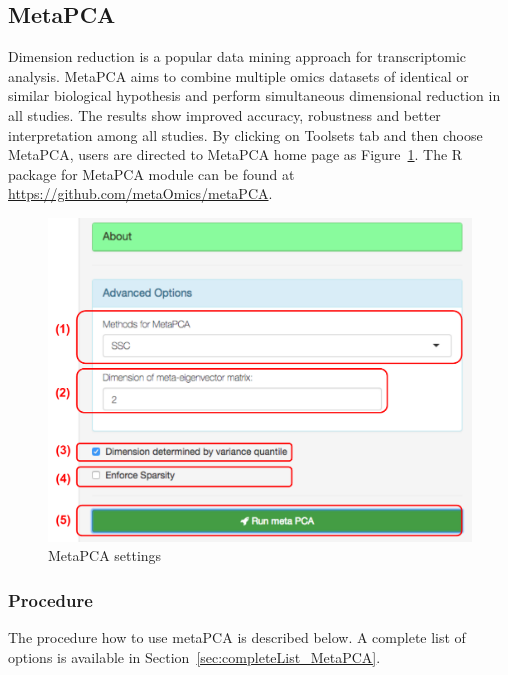 \subsection{MetaPCA}
Dimension reduction is a popular data mining approach for transcriptomic analysis.
MetaPCA aims to combine multiple omics datasets of identical or similar biological hypothesis and perform simultaneous dimensional reduction in all studies.
The results show improved accuracy, robustness and better interpretation among all studies.
By clicking on Toolsets tab and then choose MetaPCA,
users are directed to MetaPCA home page as Figure~\ref{fig:metaPCAHome}.
The R package for MetaPCA module can be found at \url{https://github.com/metaOmics/metaPCA}.

\begin{figure}[H]
\begin{center}
\includegraphics[scale=0.4]{./figure/metaPCA/metaPCAHome.pdf}
\caption{MetaPCA settings}
\label{fig:metaPCAHome}
\end{center}
\end{figure}

\subsubsection{Procedure}

The procedure how to use metaPCA is described below.
A complete list of options is available in Section~\ref{sec:completeList_MetaPCA}.

